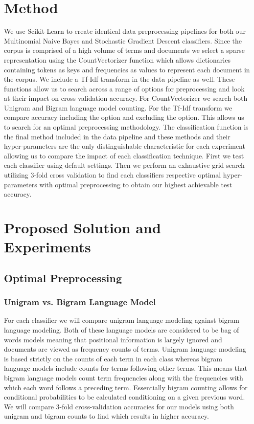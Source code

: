 \documentclass[a4paper, 12pt]{article}
\begin{document}
\section{Method}
We use \cite{pedregosa2011scikit} Scikit Learn to create identical data preprocessing pipelines for both our Multinomial Naive Bayes and Stochastic Gradient Descent classifiers.  Since the corpus is comprised of a high volume of terms and documents we select a sparse representation using the CountVectorizer function which allows dictionaries containing tokens as keys and frequencies as values to represent each document in the corpus. We include a Tf-Idf transform in the data pipeline as well. These functions allow us to search across a range of options for preprocessing and look at their impact on cross validation accuracy.  For CountVectorizer we search both Unigram and Bigram language model counting. For the Tf-Idf transform we compare accuracy including the option and excluding the option. This allows us to search for an optimal preprocessing methodology. The classification function is the final method included in the data pipeline and these methods and their hyper-parameters are the only distinguishable characteristic for each experiment allowing us to compare the impact of each classification technique. First we test each classifier using default settings. Then we perform an exhaustive grid search utilizing 3-fold cross validation to find each classifiers respective optimal hyper-parameters with optimal preprocessing to obtain our highest achievable test accuracy. \\

\section{Proposed Solution and Experiments}
\subsection{Optimal Preprocessing}
\subsubsection{Unigram vs. Bigram Language Model}
For each classifier we will compare unigram language modeling against bigram language modeling. Both of these language models are considered to be bag of words models meaning that positional information is largely ignored and documents are viewed as frequency counts of terms. Unigram language modeling is based strictly on the counts of each term in each class whereas bigram language models include counts for terms following other terms. This means that bigram language models count term frequencies along with the frequencies with which each word follows a preceding term. Essentially bigram counting allows for conditional probabilities to be calculated conditioning on a given previous word.  We will compare 3-fold cross-validation accuracies for our models using both unigram and bigram counts to find which results in higher accuracy.
\end{document}
